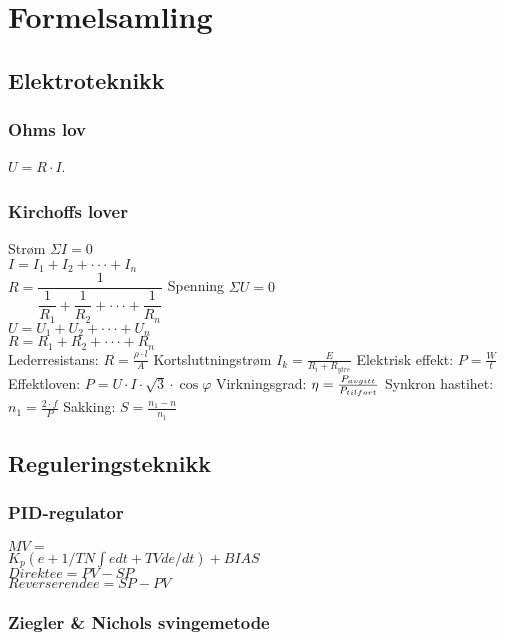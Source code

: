 \newpage
\section{Formelsamling}

\subsection{Elektroteknikk}
\vskip 2.5pt
\subsubsection*{Ohms lov}
\vskip 2.5pt
$U=R\cdot I$.
\vskip 2.5pt
\subsubsection*{Kirchoffs lover}
\vskip 2.5pt  
Strøm $\Sigma I=0$\\
\vskip 2.5pt  
$I=I_{1}+I_{2}+\cdot\cdot\cdot+I_{n}$\\
\vskip 2.5pt  
$R=\dfrac{1}{\dfrac{1}{R_{1}}+\dfrac{1}{R_{2}}+\cdot\cdot\cdot+\dfrac{1}{R_{n}}}$
\vskip 2pt
 Spenning $\Sigma U=0$\\
\vskip 2.5pt  
$U=U_{1}+U_{2}+\cdot\cdot\cdot+U_{n}$\\
\vskip 2.5pt  
$R=R_{1}+R_{2}+\cdot\cdot\cdot+R_{n}$\\
\vskip 2pt
Lederresistans: $ R=\frac{\rho\cdot l}{A}$ 
\vskip 2pt
Kortsluttningstrøm $I_{k}=\frac{E}{R_{i}+R_{ytre}}$
\vskip 2pt
Elektrisk effekt: $P=\frac{W}{t}$
\vskip 2pt  
Effektloven: $P=U\cdot I\cdot \sqrt{3} \cdot \cos \varphi$
\vskip 2.5pt  
Virkningsgrad: $\eta=\frac{P_{avgitt}}{P_{tilf\\ort}}$
\vskip 2.5pt
Synkron hastihet: $n_1=\frac{2\cdot f}{P}$
\vskip 2.5pt 
Sakking: $S=\frac{n_1-n}{n_1}$
\vskip 2.5pt 
\subsection{Reguleringsteknikk}
\vskip 2.5pt 
\subsubsection*{PID-regulator}
$MV=$\\
$K_p(e+1/TN \int e dt + TV de/dt)+BIAS$\\
\vskip 2.5pt
$Direkte e=PV-SP$\\
$Reverserende e=SP-PV$\\
\subsubsection*{Ziegler \& Nichols svingemetode}
